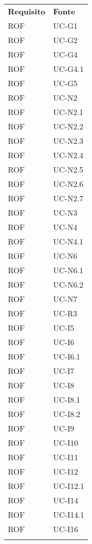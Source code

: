 \begin{longtable}{| p{5cm} | p{5cm} |}
		\rowcolor{LightBlue}
		\color{white}\bfseries Requisito & \color{white}\bfseries Fonte \\[0.25cm]
		\rowcolor{LightGray}
		ROF & UC-G1\\
		\rowcolor{LightGray}
		ROF & UC-G2\\
		ROF & UC-G4\\		
		ROF & UC-G4.1\\
		ROF & UC-G5\\
		
		ROF & UC-N2\\
		ROF & UC-N2.1\\
		\rowcolor{LightGray}
		ROF & UC-N2.2\\
		ROF & UC-N2.3\\
		\rowcolor{LightGray}
		ROF & UC-N2.4\\
		ROF & UC-N2.5\\
		\rowcolor{LightGray}
		ROF & UC-N2.6\\
		ROF & UC-N2.7\\
		ROF & UC-N3\\
		ROF & UC-N4\\
		ROF & UC-N4.1\\
		ROF & UC-N6\\
		ROF & UC-N6.1\\
		ROF & UC-N6.2\\
		ROF & UC-N7\\
		
		ROF & UC-R3\\		
		
		\rowcolor{LightGray}
		ROF & UC-I5\\
		ROF & UC-I6\\
		\rowcolor{LightGray}
		ROF & UC-I6.1\\
		ROF & UC-I7\\
		ROF & UC-I8\\
		\rowcolor{LightGray}
		ROF & UC-I8.1\\
		ROF & UC-I8.2\\
		\rowcolor{LightGray}
		ROF & UC-I9\\
		ROF & UC-I10\\
		\rowcolor{LightGray}
		ROF & UC-I11\\
		ROF & UC-I12\\
		ROF & UC-I12.1\\
		ROF & UC-I14\\
		ROF & UC-I14.1\\
		\rowcolor{LightGray}
		ROF & UC-I16\\
		\rowcolor{LightGray}
		

\end{longtable}
